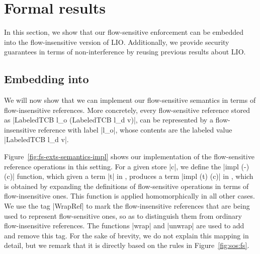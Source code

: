 \section{Formal results}
\label{sec:soundness}

In this section, we show that our flow-sensitive enforcement can be
embedded into the flow-insensitive version of LIO. Additionally, we
provide security guarantees in terms of non-interference by reusing
previous results about LIO.

\subsection{Embedding into \lio{}}

We will now show that we can implement our flow-sensitive semantics in
terms of flow-insensitive references. More concretely, every
flow-sensitive reference stored as |LabeledTCB l_o (LabeledTCB l_d
v)|, can be represented by a flow-insensitive reference with label
|l_o|, whose contents are the labeled value |LabeledTCB l_d v|.

Figure~\ref{fig:fs-exts-semantics-impl} shows our implementation of
the flow-sensitive reference operations in this setting.  For a given
store |c|, we define the |impl (-) (c)| function, which given a term
|t| in \liofs{}, produces a term |impl (t) (c)| in \lio{}, which is
obtained by expanding the definitions of flow-sensitive operations in
terms of flow-insensitive ones. This function is applied
homomorphically in all other cases. We use the tag |WrapRef| to mark
the flow-insensitive references that are being used to represent
flow-sensitive ones, so as to distinguish them from ordinary
flow-insensitive references. The functions |wrap| and |unwrap| are
used to add and remove this tag. For the sake of brevity, we do not
explain this mapping in detail, but we remark that it is directly
based on the rules in Figure~\ref{fig:sos:fs}.

